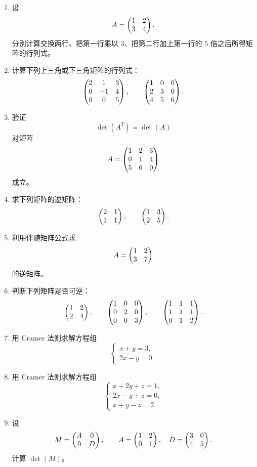 \begin{enumerate}[label=\arabic*.]
  \item \basic 设
  \[
  A=\begin{pmatrix} 1&2\\3&4 \end{pmatrix}.
  \]
  分别计算交换两行、把第一行乘以 $3$、把第二行加上第一行的 $5$ 倍之后所得矩阵的行列式。

  \item \basic 计算下列上三角或下三角矩阵的行列式：
  \[
  \begin{pmatrix} 2&1&3\\0&-1&4\\0&0&5 \end{pmatrix},
  \qquad
  \begin{pmatrix} 1&0&0\\2&3&0\\4&5&6 \end{pmatrix}.
  \]

  \item \basic 验证
  \[
  \det(A^T)=\det(A)
  \]
  对矩阵
  \[
  A=\begin{pmatrix} 1&2&3\\0&1&4\\5&6&0 \end{pmatrix}
  \]
  成立。

  \item \basic 求下列矩阵的逆矩阵：
  \[
  \begin{pmatrix} 2&1\\1&1 \end{pmatrix},
  \qquad
  \begin{pmatrix} 1&3\\2&5 \end{pmatrix}.
  \]

  \item \basic 利用伴随矩阵公式求
  \[
  A=\begin{pmatrix} 1&2\\3&7 \end{pmatrix}
  \]
  的逆矩阵。

  \item \basic 判断下列矩阵是否可逆：
  \[
  \begin{pmatrix} 1&2\\2&4 \end{pmatrix},
  \qquad
  \begin{pmatrix} 1&0&0\\0&2&0\\0&0&3 \end{pmatrix},
  \qquad
  \begin{pmatrix} 1&1&1\\1&1&1\\0&1&2 \end{pmatrix}.
  \]

  \item \basic 用 Cramer 法则求解方程组
  \[
  \begin{cases}
  x+y=3,\\
  2x-y=0.
  \end{cases}
  \]

  \item \basic 用 Cramer 法则求解方程组
  \[
  \begin{cases}
  x+2y+z=1,\\
  2x-y+z=0,\\
  x+y-z=2.
  \end{cases}
  \]

  \item \basic 设
  \[
  M=\begin{pmatrix} A&0\\0&D \end{pmatrix},
  \qquad
  A=\begin{pmatrix} 1&2\\0&1 \end{pmatrix},\quad D=\begin{pmatrix} 3&0\\4&5 \end{pmatrix}.
  \]
  计算 $\det(M)$。


\end{enumerate}
